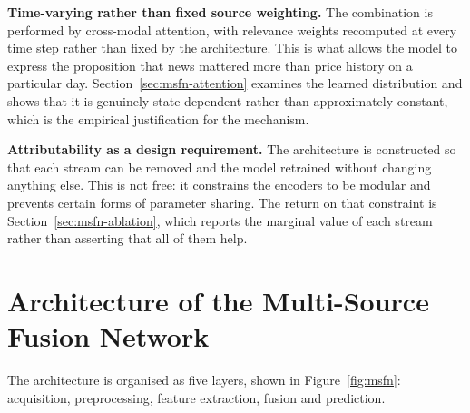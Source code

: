 \textbf{Time-varying rather than fixed source weighting.} The combination is performed by
cross-modal attention, with relevance weights recomputed at every time step rather than fixed by
the architecture. This is what allows the model to express the proposition that news mattered
more than price history on a particular day. Section~\ref{sec:msfn-attention} examines the
learned distribution and shows that it is genuinely state-dependent rather than approximately
constant, which is the empirical justification for the mechanism.

\textbf{Attributability as a design requirement.} The architecture is constructed so that each
stream can be removed and the model retrained without changing anything else. This is not free:
it constrains the encoders to be modular and prevents certain forms of parameter sharing. The
return on that constraint is Section~\ref{sec:msfn-ablation}, which reports the marginal value
of each stream rather than asserting that all of them help.

\section{Architecture of the Multi-Source Fusion Network}
\label{sec:msfn-arch}

The architecture is organised as five layers, shown in Figure~\ref{fig:msfn}: acquisition,
preprocessing, feature extraction, fusion and prediction.

